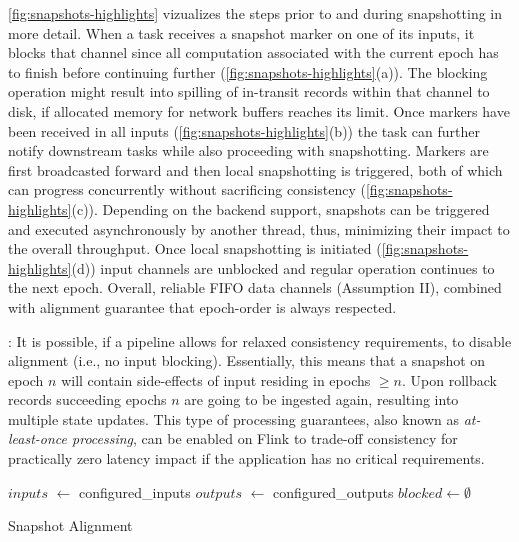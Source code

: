  \autoref{fig:snapshots-highlights} vizualizes the steps prior to and during snapshotting in more detail. When a task receives a snapshot marker on one of its inputs, it blocks that channel since all computation associated with the current epoch has to finish before continuing further (\autoref{fig:snapshots-highlights}(a)). The blocking operation might result into spilling of in-transit records within that channel to disk, if allocated memory for network buffers reaches its limit. Once markers have been received in all inputs (\autoref{fig:snapshots-highlights}(b)) the task can further notify downstream tasks while also proceeding with snapshotting. Markers are first broadcasted forward and then local snapshotting is triggered, both of which can progress concurrently without sacrificing consistency (\autoref{fig:snapshots-highlights}(c)). Depending on the backend support, snapshots can be triggered and executed asynchronously by another thread, thus, minimizing their impact to the overall throughput. Once local snapshotting is initiated (\autoref{fig:snapshots-highlights}(d)) input channels are unblocked and regular operation continues to the next epoch. Overall, reliable FIFO data channels (Assumption II), combined with alignment guarantee that epoch-order is always respected. 

: It is possible, if a pipeline allows for relaxed consistency requirements, to disable alignment (i.e., no input blocking). Essentially, this means that a snapshot on epoch $n$ will contain side-effects of input residing in epochs $\geq n$. Upon rollback records succeeding epochs $n$ are going to be ingested again, resulting into multiple state updates. This type of processing guarantees, also known as \emph{at-least-once processing}, can be enabled on Flink to trade-off consistency for practically zero latency impact if the application has no critical requirements.


\begin{algorithm}[h]
$inputs$ $\leftarrow$ configured\_inputs\;
$outputs$ $\leftarrow$ configured\_outputs\;
$blocked \leftarrow \emptyset$ \;

\caption{Snapshot Alignment}
\label{alg:snapdag}
\end{algorithm}

